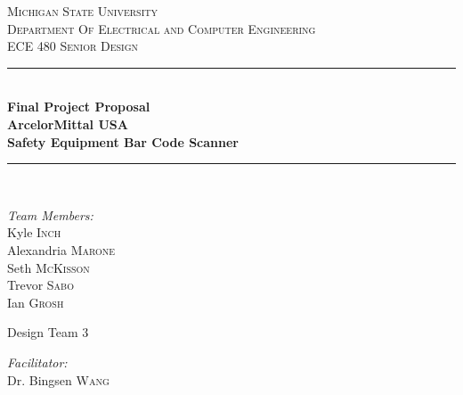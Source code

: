 \begin{titlepage}
		             
		\newcommand{\HRule}{\rule{\linewidth}{0.5mm}} %
		
		\center %
		
		
		\textsc{\LARGE Michigan State University}\\[0.5cm] %
		\textsc{\Large Department Of Electrical and Computer Engineering}\\[0.5cm] %
		\textsc{\Large ECE 480 Senior Design}\\[0.5cm]
		
		
		\HRule \\[0.2cm]
		{ \huge \bfseries Final Project Proposal\\ ArcelorMittal USA\\ Safety Equipment Bar Code Scanner}\\[0.2cm] %
		\HRule \\[1.5cm]
		
		\noindent
		\begin{minipage}[t]{0.3\textwidth}
			\begin{flushleft} \large
				\emph{Team Members:}\\
				Kyle \textsc{Inch}\\
				Alexandria \textsc{Marone}\\
				Seth \textsc{McKisson}\\
				Trevor \textsc{Sabo}\\
				Ian \textsc{Grosh}\\ %
			\end{flushleft}
		\end{minipage}%
		\begin{minipage}{0.3\textwidth}
			\centering
			{\LARGE Design Team 3}
		\end{minipage}
		\begin{minipage}[t]{0.3\textwidth}
			\begin{flushright} \large
				\emph{Facilitator:}\\  %
				Dr. Bingsen \textsc{Wang}
				

\end{flushright}
\end{minipage}
\end{titlepage}

